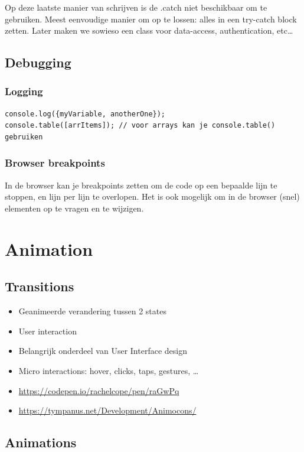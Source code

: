 \documentclass{article}
\begin{document}
Op deze laatste manier van schrijven is de .catch niet beschikbaar om te gebruiken.
Meest eenvoudige manier om op te lossen: alles in een try-catch block zetten.
Later maken we sowieso een class voor data-access, authentication, etc\dots


\subsection{Debugging}

\subsubsection{Logging}
\begin{lstlisting}
console.log({myVariable, anotherOne});
console.table([arrItems]); // voor arrays kan je console.table() gebruiken
\end{lstlisting}

\subsubsection{Browser breakpoints}

In de browser kan je breakpoints zetten om de code op een bepaalde lijn te stoppen, en lijn per lijn te overlopen.
Het is ook mogelijk om in de browser (snel) elementen op te vragen en te wijzigen.


\section{Animation}

\subsection{Transitions}

\begin{itemize}
    \item Geanimeerde verandering tussen 2 states
    \item User interaction
    \item Belangrijk onderdeel van User Interface design
    \item Micro interactions: hover, clicks, taps, gestures, \dots
    \item \url{https://codepen.io/rachelcope/pen/raGwPq}
    \item \url{https://tympanus.net/Development/Animocons/}
\end{itemize}

\subsection{Animations}
\end{document}
